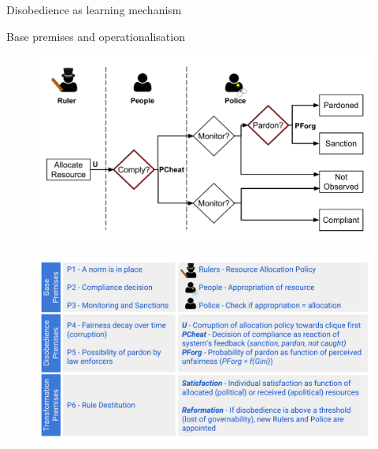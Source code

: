 \documentclass[xcolor={table}]{beamer}
\begin{document}
\begin{frame}[fragile=singleslide,t]
\begin{columns}[T]
\begin{column}{.42\textwidth}
\begin{block}{Disobedience as learning mechanism}
\end{block}




\begin{block}{Base premises and operationalisation}

\begin{figure}
  \centering
  \includegraphics[width=0.9\linewidth]{img/disobedience_flow.pdf}
\end{figure}

\begin{figure}
  \centering
  \includegraphics[width=0.9\linewidth]{img/disobedience_summary.pdf}
\end{figure}



\end{block} 


\end{column}
\end{columns}
\end{frame}
\end{document}
